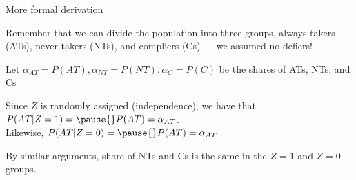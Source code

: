 \documentclass[11pt,english,handout]{beamer}
\newenvironment{wideitemize}{\itemize\addtolength{\itemsep}{10pt}}{\enditemize}
\begin{document}
\begin{frame}{More formal derivation}

\begin{wideitemize}
	\item
	Remember that we can divide the population into three groups, always-takers (ATs), never-takers (NTs), and compliers (Cs) \pause --- we assumed no defiers!
	
	\item
	Let $\alpha_{AT} = P(AT), \alpha_{NT} = P(NT), \alpha_{C} = P(C)$ be the shares of ATs, NTs, and Cs
	
	\pause
	\item
	Since $Z$ is randomly assigned (independence), we have that 
	$P(AT |  Z = 1) =\pause{} P(AT) = \alpha_{AT}$. \\ \pause
	Likewise, $P(AT |  Z = 0) =\pause{} P(AT) = \alpha_{AT}$
	
	\pause
	\item
	By similar arguments, share of NTs and Cs is the same in the $Z=1$ and $Z = 0$ groups.
\end{wideitemize}	
	
\end{frame}
\end{document}
